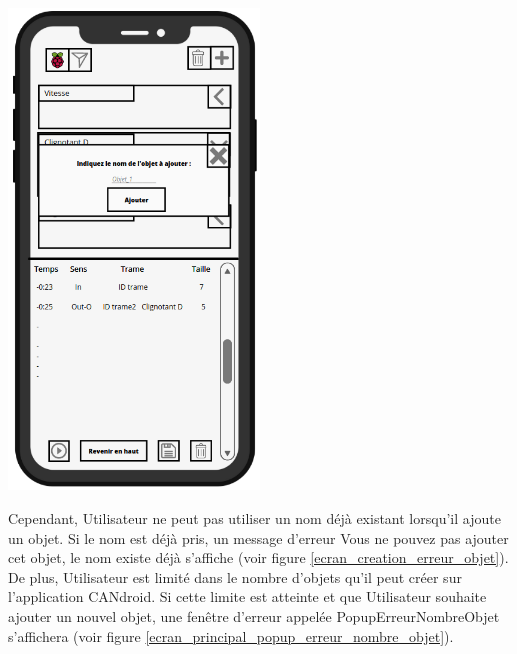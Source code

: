 \begin{minipage}{1\linewidth}
    \centering
    \includegraphics[width=0.5\textwidth]{sections/3_Exigences_specifiques/1_IHM/ihm/ecranCreationObjet.png}
    \label{ecran_creation_objet}
\end{minipage}\hfill 

\newpage

Cependant, Utilisateur ne peut pas utiliser un nom déjà existant lorsqu'il ajoute un objet. Si le nom est déjà pris, un message d'erreur {\guillemetleft} Vous ne pouvez pas ajouter cet objet, le nom existe déjà {\guillemetright} s'affiche (voir figure \ref{ecran_creation_erreur_objet}). \newline \\ De plus, Utilisateur est limité dans le nombre d'objets qu'il peut créer sur l'application CANdroid. Si cette limite est atteinte et que Utilisateur souhaite ajouter un nouvel objet, une fenêtre d'erreur appelée PopupErreurNombreObjet s'affichera (voir figure \ref{ecran_principal_popup_erreur_nombre_objet}). \\\\

